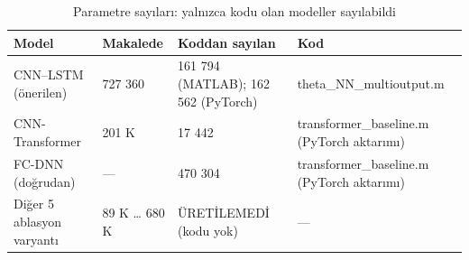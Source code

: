\begin{table}[t]
\centering
\caption{Parametre sayıları: yalnızca kodu olan modeller sayılabildi}
\begin{tabular}{llll}
\toprule
Model & Makalede & Koddan sayılan & Kod \\
\midrule
CNN–LSTM (önerilen) & 727 360 & 161 794 (MATLAB); 162 562 (PyTorch) & theta\_NN\_multioutput.m \\
CNN-Transformer & 201 K & 17 442 & transformer\_baseline.m (PyTorch aktarımı) \\
FC-DNN (doğrudan) & — & 470 304 & transformer\_baseline.m (PyTorch aktarımı) \\
Diğer 5 ablasyon varyantı & 89 K … 680 K & ÜRETİLEMEDİ (kodu yok) & — \\
\bottomrule
\end{tabular}
\end{table}

